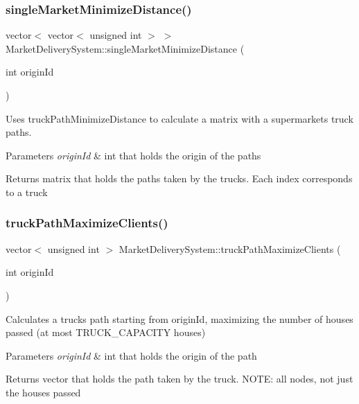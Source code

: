 \subsubsection{\texorpdfstring{single\+Market\+Minimize\+Distance()}{singleMarketMinimizeDistance()}}
{\footnotesize\ttfamily vector$<$ vector$<$ unsigned int $>$ $>$ Market\+Delivery\+System\+::single\+Market\+Minimize\+Distance (\begin{DoxyParamCaption}\item[{int}]{origin\+Id }\end{DoxyParamCaption})}



Uses truck\+Path\+Minimize\+Distance to calculate a matrix with a supermarket\textquotesingle{}s truck paths. 


\begin{DoxyParams}{Parameters}
{\em origin\+Id} & int that holds the origin of the paths \\
\hline
\end{DoxyParams}
\begin{DoxyReturn}{Returns}
matrix that holds the paths taken by the trucks. Each index corresponds to a truck 
\end{DoxyReturn}
\hypertarget{class_market_delivery_system_aa2d677bd82dc281d44980012a18691f0}{}\label{class_market_delivery_system_aa2d677bd82dc281d44980012a18691f0} 
\subsubsection{\texorpdfstring{truck\+Path\+Maximize\+Clients()}{truckPathMaximizeClients()}}
{\footnotesize\ttfamily vector$<$ unsigned int $>$ Market\+Delivery\+System\+::truck\+Path\+Maximize\+Clients (\begin{DoxyParamCaption}\item[{int}]{origin\+Id }\end{DoxyParamCaption})}



Calculates a truck\textquotesingle{}s path starting from origin\+Id, maximizing the number of houses passed (at most T\+R\+U\+C\+K\+\_\+\+C\+A\+P\+A\+C\+I\+TY houses) 


\begin{DoxyParams}{Parameters}
{\em origin\+Id} & int that holds the origin of the path \\
\hline
\end{DoxyParams}
\begin{DoxyReturn}{Returns}
vector that holds the path taken by the truck. N\+O\+TE\+: all nodes, not just the houses passed 
\end{DoxyReturn}
\hypertarget{class_market_delivery_system_ae49235884bbd0173f618b1e01ccb040a}{}\label{class_market_delivery_system_ae49235884bbd0173f618b1e01ccb040a} 
